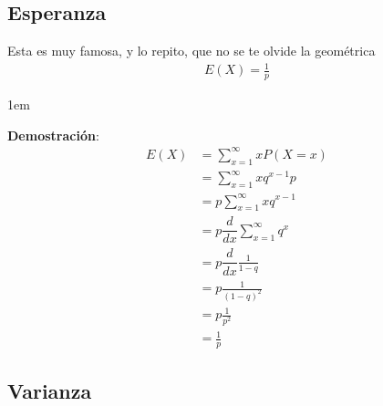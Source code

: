 \documentclass[12pt, fleqn]{report}                             %
\newenvironment{SmallIndentation}[1][0.75em]                    %
        {\begin{adjustwidth}{#1}{}\begin{footnotesize}}             %
        {\end{footnotesize}\end{adjustwidth}}                       %
\theoremstyle{break}                                            %
\newcommand \MiniDerivate[1][x] {\dfrac{d}{d #1}}               %
\begin{document}
            \clearpage
            \subsection{Esperanza}

                Esta es muy famosa, y lo repito, que no se te olvide la geométrica
                \begin{align*}
                    E(X) = \frac{1}{p}
                \end{align*}

                \begin{SmallIndentation}[1em]
                    \textbf{Demostración}:
                    \begin{align*}
                         E(X)
                            &= \sum_{x=1}^\infty xP(X = x)                          \\
                            &= \sum_{x=1}^\infty x q^{x - 1}p                       \\
                            &= p\sum_{x=1}^\infty x q^{x - 1}                       \\
                            &= p \MiniDerivate \sum_{x=1}^\infty q^x                \\
                            &= p \MiniDerivate \frac{1}{1 - q}                      \\
                            &= p \frac{1}{(1- q)^2}                                 \\
                            &= p \frac{1}{p^2}                                      \\
                            &= \frac{1}{p}                                  
                    \end{align*}    
                
                \end{SmallIndentation}
                      
            \clearpage
            \subsection{Varianza}
\end{document}
